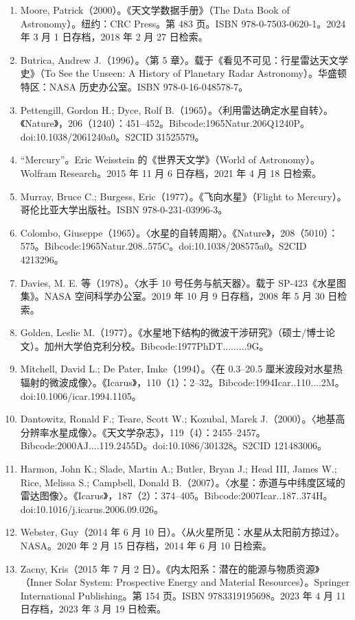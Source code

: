\begin{enumerate}
    \item Moore, Patrick（2000）。《天文学数据手册》（The Data Book of Astronomy）。纽约：CRC Press。第 483 页。ISBN 978-0-7503-0620-1。2024 年 3 月 1 日存档，2018 年 2 月 27 日检索。
    \item Butrica, Andrew J.（1996）。〈第 5 章〉。载于《看见不可见：行星雷达天文学史》（To See the Unseen: A History of Planetary Radar Astronomy）。华盛顿特区：NASA 历史办公室。ISBN 978-0-16-048578-7。
    \item Pettengill, Gordon H.; Dyce, Rolf B.（1965）。〈利用雷达确定水星自转〉。《Nature》，206（1240）：451–452。Bibcode:1965Natur.206Q1240P。doi:10.1038/2061240a0。S2CID 31525579。
    \item “Mercury”。Eric Weisstein 的《世界天文学》（World of Astronomy）。Wolfram Research。2015 年 11 月 6 日存档，2021 年 4 月 18 日检索。
    \item Murray, Bruce C.; Burgess, Eric（1977）。《飞向水星》（Flight to Mercury）。哥伦比亚大学出版社。ISBN 978-0-231-03996-3。
    \item Colombo, Giuseppe（1965）。〈水星的自转周期〉。《Nature》，208（5010）：575。Bibcode:1965Natur.208..575C。doi:10.1038/208575a0。S2CID 4213296。
    \item Davies, M. E. 等（1978）。〈水手 10 号任务与航天器〉。载于 SP-423《水星图集》。NASA 空间科学办公室。2019 年 10 月 9 日存档，2008 年 5 月 30 日检索。
    \item Golden, Leslie M.（1977）。《水星地下结构的微波干涉研究》（硕士/博士论文）。加州大学伯克利分校。Bibcode:1977PhDT.........9G。
    \item Mitchell, David L.; De Pater, Imke（1994）。〈在 0.3–20.5 厘米波段对水星热辐射的微波成像〉。《Icarus》，110（1）：2–32。Bibcode:1994Icar..110....2M。doi:10.1006/icar.1994.1105。
    \item Dantowitz, Ronald F.; Teare, Scott W.; Kozubal, Marek J.（2000）。〈地基高分辨率水星成像〉。《天文学杂志》，119（4）：2455–2457。Bibcode:2000AJ....119.2455D。doi:10.1086/301328。S2CID 121483006。
    \item Harmon, John K.; Slade, Martin A.; Butler, Bryan J.; Head III, James W.; Rice, Melissa S.; Campbell, Donald B.（2007）。〈水星：赤道与中纬度区域的雷达图像〉。《Icarus》，187（2）：374–405。Bibcode:2007Icar..187..374H。doi:10.1016/j.icarus.2006.09.026。
    \item Webster, Guy（2014 年 6 月 10 日）。〈从火星所见：水星从太阳前方掠过〉。NASA。2020 年 2 月 15 日存档，2014 年 6 月 10 日检索。
    \item Zacny, Kris（2015 年 7 月 2 日）。《内太阳系：潜在的能源与物质资源》（Inner Solar System: Prospective Energy and Material Resources）。Springer International Publishing。第 154 页。ISBN 9783319195698。2023 年 4 月 11 日存档，2023 年 3 月 19 日检索。

\end{enumerate}
